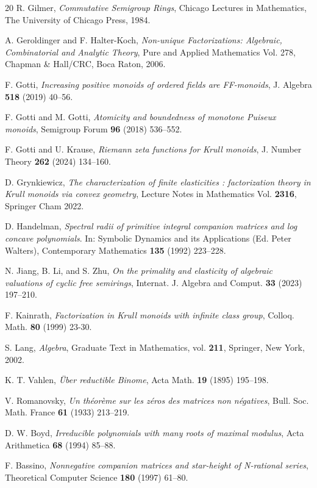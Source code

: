 \documentclass[11pt]{amsart}
\theoremstyle{definition}
\theoremstyle{remark}
\numberwithin{equation}{section}
\begin{document}
\begin{thebibliography}{20}
	 R. Gilmer, \emph{Commutative Semigroup Rings}, Chicago Lectures in Mathematics, The University of Chicago Press, 1984.
	
	 A. Geroldinger and F. Halter-Koch, \emph{Non-unique Factorizations: Algebraic, Combinatorial and Analytic Theory}, Pure and Applied Mathematics Vol. 278, Chapman \& Hall/CRC, Boca Raton, 2006.
	
	 F. Gotti, \emph{Increasing positive monoids of ordered fields are FF-monoids}, J. Algebra \textbf{518} (2019) 40--56.
	
	 F. Gotti and M. Gotti, \emph{Atomicity and boundedness of monotone Puiseux monoids}, Semigroup Forum \textbf{96} (2018) 536--552.
	
	 F. Gotti and U. Krause, \emph{Riemann zeta functions for Krull monoids}, J. Number Theory \textbf{262} (2024) 134--160.
	
	 D. Grynkiewicz, \emph{The characterization of finite elasticities : factorization theory in Krull monoids via convex geometry}, Lecture Notes in Mathematics Vol. \textbf{2316}, Springer Cham 2022.
	
	 D. Handelman, \emph{Spectral radii of primitive integral companion matrices and log concave polynomials}. In: Symbolic Dynamics and its Applications (Ed. Peter Walters), Contemporary Mathematics \textbf{135} (1992) 223--228.
	
	 N. Jiang, B. Li, and S. Zhu, \emph{On the primality and elasticity of algebraic valuations of cyclic free semirings}, Internat. J. Algebra and Comput. \textbf{33} (2023) 197--210.
	
	 F. Kainrath, \emph{Factorization in Krull monoids with infinite class group}, Colloq. Math. \textbf{80} (1999) 23-30.
	
	 S. Lang, \emph{Algebra}, Graduate Text in Mathematics, vol. \textbf{211}, Springer, New York, 2002.
	
	 K. T. Vahlen, \emph{\"Uber reductible Binome}, Acta Math. \textbf{19} (1895) 195--198.
	
	 V. Romanovsky, \emph{Un th\'eorème sur les z\'eros des matrices non n\'egatives}, Bull. Soc. Math. France \textbf{61} (1933) 213--219.
	
	 D. W. Boyd, \emph{Irreducible polynomials with many roots of maximal modulus}, Acta Arithmetica \textbf{68} (1994) 85--88.
	
	 F. Bassino, \emph{Nonnegative companion matrices and star-height of N-rational series}, Theoretical Computer Science \textbf{180} (1997) 61--80.
	
\end{thebibliography}
\end{document}
